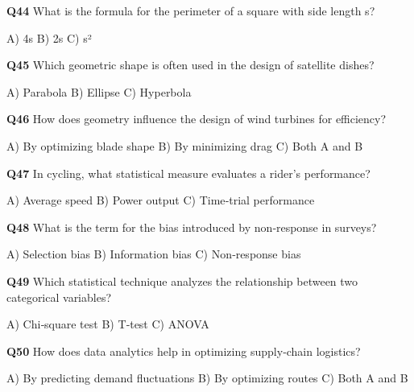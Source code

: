 \textbf{Q44} What is the formula for the perimeter of a square with side length s?\par
    A) 4s  
    B) 2s  
    C) s²

\textbf{Q45} Which geometric shape is often used in the design of satellite dishes?\par
    A) Parabola  
    B) Ellipse  
    C) Hyperbola

\textbf{Q46} How does geometry influence the design of wind turbines for efficiency?\par
    A) By optimizing blade shape  
    B) By minimizing drag  
    C) Both A and B

\textbf{Q47} In cycling, what statistical measure evaluates a rider's performance?\par
    A) Average speed  
    B) Power output  
    C) Time‑trial performance

\textbf{Q48} What is the term for the bias introduced by non‑response in surveys?\par
    A) Selection bias  
    B) Information bias  
    C) Non‑response bias

\textbf{Q49} Which statistical technique analyzes the relationship between two categorical variables?\par
    A) Chi‑square test  
    B) T‑test  
    C) ANOVA

\textbf{Q50} How does data analytics help in optimizing supply‑chain logistics?\par
    A) By predicting demand fluctuations  
    B) By optimizing routes  
    C) Both A and B 